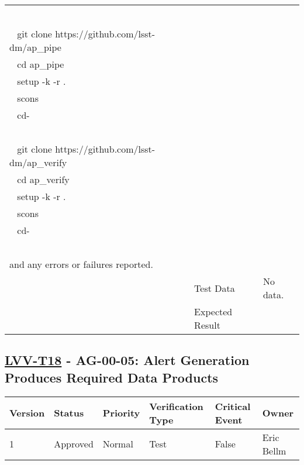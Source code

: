 \begin{longtable}[]{p{1.3cm}p{2cm}p{13cm}}
\begin{minipage}[t]{13cm}
{\hspace*{0.333em} ~ cd-\\
\hspace*{0.333em} ~\\
\hspace*{0.333em} ~ git clone https://github.com/lsst-dm/ap\_pipe\\
\hspace*{0.333em} ~ cd ap\_pipe\\
\hspace*{0.333em} ~ setup -k -r .\\
\hspace*{0.333em} ~ scons\\
\hspace*{0.333em} ~ cd-\\
\hspace*{0.333em} ~\\
\hspace*{0.333em} ~ git clone https://github.com/lsst-dm/ap\_verify\\
\hspace*{0.333em} ~ cd ap\_verify\\
\hspace*{0.333em} ~ setup -k -r .\\
\hspace*{0.333em} ~ scons\\
\hspace*{0.333em} ~ cd-\\
~\\
and any errors or failures reported.

\vspace{\dp0}
} \end{minipage} \\ \cline{2-3}
& Test Data &
\begin{minipage}[t]{13cm}{\footnotesize
No data.
\vspace{\dp0}
} \end{minipage} \\ \cline{2-3}
& Expected Result &
\\ \midrule
\end{longtable}

\subsection{\href{https://jira.lsstcorp.org/secure/Tests.jspa\#/testCase/LVV-T18}{LVV-T18}
    - AG-00-05: Alert Generation Produces Required Data Products}\label{lvv-t18}

\begin{longtable}[]{llllll}
\toprule
Version & Status & Priority & Verification Type & Critical Event & Owner
\\\midrule
1 & Approved & Normal &
Test & False & Eric Bellm
\\\bottomrule
\end{longtable}

